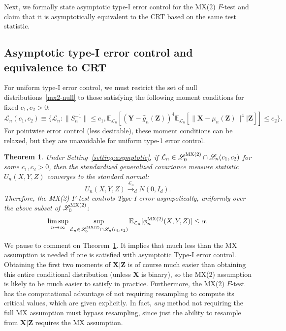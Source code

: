 \documentclass[12pt]{article}
\newtheorem{theorem}{Theorem}
\theoremstyle{definition}
\theoremstyle{remark}
\newcommand{\prx}{\bm X}
\newcommand{\srx}{X}
\newcommand{\prz}{\bm Z}
\newcommand{\srz}{Z}
\newcommand{\pry}{{\bm Y}}
\newcommand{\sry}{Y}
\begin{document}
Next, we formally state asymptotic type-I error control for the MX(2) $F$-test and claim that it is asymptotically equivalent to the CRT based on the same test statistic. 

\subsection{Asymptotic type-I error control and equivalence to CRT} \label{sec:MX(2)-regression}

For uniform type-I error control, we must restrict the set of null distributions~\eqref{mx2-null} to those satisfying the following moment conditions for fixed $c_1, c_2 > 0$:
\begin{equation}
	\mathscr L_n(c_1, c_2) \equiv \{\mathcal L_n: \|S_{n}^{-1}\| \leq c_1, \mathbb E_{\mathcal L_n}\left[(\pry - \widehat g_n(\prz))^{4} \mathbb E_{\mathcal L_n}[\|\prx - \mu_n(\prz)\|^{4}|\prz]\right] \leq c_2 \}.
\end{equation} 
For pointwise error control (less desirable), these moment conditions can be relaxed, but they are unavoidable for uniform type-1 error control.

\begin{theorem} \label{thm:asymptotic-alpha-level}
Under Setting~\ref{setting:asymptotic}, if $\mathcal L_n \in \mathscr L_0^{\textnormal{MX(2)}}\cap \mathscr L_n(c_1, c_2)$ for some $c_1, c_2 > 0$, then the standardized generalized covariance measure statistic $U_n(\srx, \sry, \srz)$ converges to the standard normal: 
	\begin{equation}
	U_n(\srx, \sry, \srz) \overset{\mathcal L_n}\rightarrow_d N(0, I_d).
	\label{eq:asymptotic-normality}
	\end{equation}
Therefore, the MX(2) $F$-test controls Type-I error asympotically, uniformly over the above subset of $\mathscr L_0^{\textnormal{MX(2)}}$: 
	\begin{equation}
	\limsup_{n \rightarrow \infty} \sup_{\mathcal L_n \in \mathscr L_0^{\textnormal{MX(2)}}\cap \mathscr L_n(c_1, c_2)} \mathbb E_{\mathcal L_n}[\phi^{\textnormal{MX(2)}}_n(\srx, \sry, \srz)] \leq \alpha.
	\label{asymptotic-alpha-level}
	\end{equation}
\end{theorem}

We pause to comment on Theorem~\ref{thm:asymptotic-alpha-level}. It implies that much less than the MX assumption is needed if one is satisfied with asymptotic Type-I error control. Obtaining the first two moments of $\prx|\prz$ is of course much easier than obtaining this entire conditional distribution (unless $\prx$ is binary), so the MX(2) assumption is likely to be much easier to satisfy in practice. Furthermore, the MX(2) $F$-test has the computational advantage of not requiring resampling to compute its critical values, which are given explicitly. In fact, \textit{any} method not requiring the full MX assumption must bypass resampling, since just the ability to resample from $\prx|\prz$ requires the MX assumption. 
\end{document}

